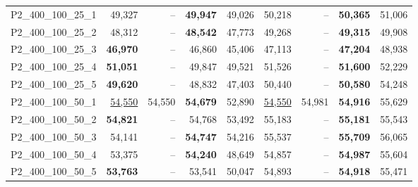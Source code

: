 \documentclass[ppgc,tese,english,formais,babel]{iiufrgs}
\begin{document}
\begin{table}[!ht]
{\begin{tabular}{lrrrrrrrr}
P2\_400\_100\_25\_1 & 49,327 & -- & \textbf{49,947} & 49,026 & 50,218 & -- & \textbf{50,365} & 51,006 \\
P2\_400\_100\_25\_2 & 48,312 & -- & \textbf{48,542} & 47,773 & 49,268 & -- & \textbf{49,315} & 49,908 \\
P2\_400\_100\_25\_3 & \textbf{46,970} & -- & 46,860 & 45,406 & 47,113 & -- & \textbf{47,204} & 48,938 \\
P2\_400\_100\_25\_4 & \textbf{51,051} & -- & 49,847 & 49,521 & 51,526 & -- & \textbf{51,600} & 52,229 \\
P2\_400\_100\_25\_5 & \textbf{49,620} & -- & 48,832 & 47,403 & 50,440 & -- & \textbf{50,580} & 54,248 \\
P2\_400\_100\_50\_1 & \underline{54,550} & 54,550 & \textbf{54,679} & 52,890 & \underline{54,550} & 54,981 & \textbf{54,916} & 55,629 \\
P2\_400\_100\_50\_2 & \textbf{54,821} & -- & 54,768 & 53,492 & 55,183 & -- & \textbf{55,181} & 55,543 \\
P2\_400\_100\_50\_3 & 54,141 & -- & \textbf{54,747} & 54,216 & 55,537 & -- & \textbf{55,709} & 56,065 \\
P2\_400\_100\_50\_4 & 53,375 & -- & \textbf{54,240} & 48,649 & 54,857 & -- & \textbf{54,987} & 55,604 \\
P2\_400\_100\_50\_5 & \textbf{53,763} & -- & 53,541 & 50,047 & 54,893 & -- & \textbf{54,918} & 55,471 \\\hline\hline
\end{tabular}
} %
\label{tab:velasco_new_results_II}
\end{table}
\end{document}
